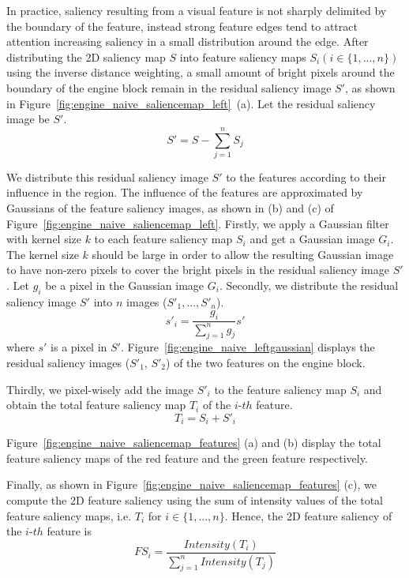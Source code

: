 In practice, saliency resulting from a visual feature is not sharply delimited by the boundary of the feature, instead strong feature edges tend to attract attention increasing saliency in a small distribution around the edge.
After distributing the 2D saliency map $ S $ into feature saliency maps $ S_{i} (i \in \{1, ... ,n\})$ using the inverse distance weighting, a small amount of bright pixels around the boundary of the engine block remain in the residual saliency image $ S' $, as shown in Figure~\ref{fig:engine_naive_saliencemap_left}~(a).
Let the residual saliency image be $ S' $.
\[ S'=S- \sum_{j=1}^{n} S_{j} \]

We distribute this residual saliency image $ S' $ to the features according to their influence in the region. The influence of the features are approximated by Gaussians of the feature saliency images, as shown in (b) and (c) of Figure~\ref{fig:engine_naive_saliencemap_left}.
Firstly, we apply a Gaussian filter with kernel size $ k $ to each feature saliency map $ S_{i} $ and get a Gaussian image $ G_{i} $.
The kernel size $ k $ should be large in order to allow the resulting Gaussian image to have non-zero pixels to cover the bright pixels in the residual saliency image $ S' $.
Let $ g_{i} $ be a pixel in the Gaussian image $ G_{i} $.
Secondly, we distribute the residual saliency image $ S' $ into $ n $ images ($ S'_{1} , ... , S'_{n} $).
\[ s'_{i} = \frac{ g_{i} }{ \sum_{j=1}^{n} g_{j} }s' \]
where $ s' $ is a pixel in $ S' $.
Figure~\ref{fig:engine_naive_leftgaussian} displays the residual saliency images ($ S'_{1} $, $ S'_{2} $) of the two features on the engine block. 

Thirdly, we pixel-wisely add the image $ S'_{i} $ to the feature saliency map $ S_{i} $ and obtain the total feature saliency map $ T_{i} $ of the $i$-$th$ feature.
\[ T_{i} =S_{i}+S'_{i}\]

Figure~\ref{fig:engine_naive_saliencemap_features} (a) and (b) display the total feature saliency maps of the red feature and the green feature respectively.

Finally, as shown in Figure~\ref{fig:engine_naive_saliencemap_features} (c), we compute the 2D feature saliency using the sum of intensity values of the total feature saliency maps, i.e. $ T_{i}$ for $ i \in \{1, ... ,n\} $.
Hence, the 2D feature saliency of the $i$-$th$  feature is
\[ FS_{i}=\frac{Intensity(T_{i})}{ \sum_{j=1}^{n} Intensity(T_{j}) } \]

